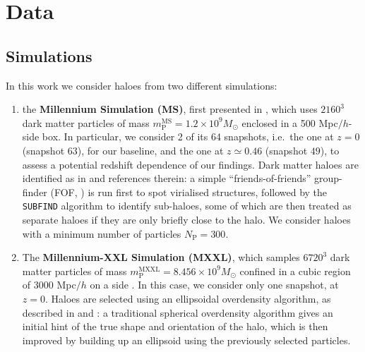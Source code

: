 \documentclass[a4paper,11pt]{article}
\begin{document}
\section{Data}
\label{sec:data}
\subsection{Simulations}
\label{subsec:sim}
In this work we consider haloes from two different simulations: 
\begin{enumerate}
\item the \textbf{Millennium Simulation (MS)}, first presented in \cite{Springeletal2005}, which uses $2160^3$ dark matter particles of mass $m_{\mathrm{P}}^{\mathrm{MS}} =1.2 \times 10^9 M_{\odot}$ enclosed in a 500 Mpc$/h$-side box.
In particular, we consider 2 of its 64 snapshots, i.e.\ the one at $z = 0$ (snapshot $63$), for our baseline, and the one at $z \simeq 0.46$ (snapshot $49$), to assess a potential redshift dependence of our findings. Dark matter haloes are identified as in \cite{Joachimietal2013a} and references therein: a simple ``friends-of-friends'' group-finder (FOF, \cite{Davisetal1985}) is run first to spot virialised structures, followed by the \texttt{SUBFIND} algorithm \cite{Springeletal2001, Springeletal2005} to identify sub-haloes, some of which are then treated as separate haloes if they are only briefly close to the halo. We consider haloes with a minimum number of particles $N_{\mathrm{P}} = 300$.
\item The \textbf{Millennium-XXL Simulation (MXXL)}, which samples $6720^3$ dark matter particles of mass $m_{\mathrm{P}}^{\mathrm{MXXL}} = 8.456 \times 10^9 M_{\odot}$ confined in a cubic region of $3000$ Mpc$/h$ on a side \cite{Anguloetal2012}. In this case, we consider only one snapshot, at $z = 0$. Haloes are selected using an ellipsoidal overdensity algorithm, as described in \cite{Despalietal2013} and \cite{Bonamigoetal2015}: a traditional spherical overdensity algorithm \cite{LaceyCole1994} gives an initial hint of the true shape and orientation of the halo, which is then improved by building up an ellipsoid using the previously selected particles. %
\end{enumerate} 
\end{document}

